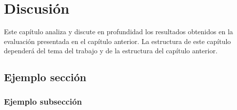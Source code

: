 
\chapter{Discusión}
\label{ch:Discusion}

\noindent Este capítulo analiza y discute en profundidad los resultados obtenidos en la evaluación presentada en el capítulo anterior. La estructura de este capítulo dependerá del tema del trabajo y de la estructura del capítulo anterior.

\section{Ejemplo sección}
\label{sec:Ejemplo_seccion1}

\subsection{Ejemplo subsección}
\label{sec:Ejemplo_subSeccion1}